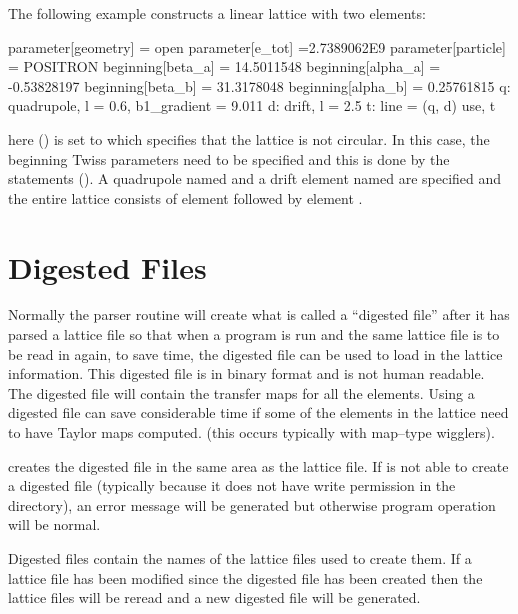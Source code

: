 The following example constructs a linear lattice with two elements: 
\begin{example}
  parameter[geometry] = open
  parameter[e_tot] =2.7389062E9
  parameter[particle] = POSITRON
  beginning[beta_a] = 14.5011548
  beginning[alpha_a] = -0.53828197
  beginning[beta_b] = 31.3178048
  beginning[alpha_b] = 0.25761815
  q: quadrupole, l = 0.6, b1_gradient = 9.011
  d: drift, l = 2.5
  t: line = (q, d)
  use, t 
\end{example}
here  () is set to  which specifies that the lattice
is not circular. In this case, the beginning Twiss parameters need to be specified and this is done
by the  statements (). A quadrupole named  and a drift element
named  are specified and the entire lattice consists of element  followed by element
.

\section{Digested Files}
\label{s:digested}

Normally the \bmad parser routine will create what is called a ``digested file'' after it has parsed
a lattice file so that when a program is run and the same lattice file is to be read in again, to
save time, the digested file can be used to load in the lattice information.  This digested file is
in binary format and is not human readable. The digested file will contain the transfer maps for all
the elements.  Using a digested file can save considerable time if some of the elements in the
lattice need to have Taylor maps computed.  (this occurs typically with map--type wigglers).

\bmad creates the digested file in the same area as the lattice file.  If \bmad is not able to
create a digested file (typically because it does not have write permission in the directory), an
error message will be generated but otherwise program operation will be normal.

Digested files contain the names of the lattice files used to create them. If a lattice file has
been modified since the digested file has been created then the lattice files will be reread and a
new digested file will be generated.

